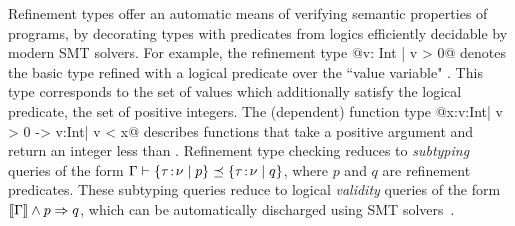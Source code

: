 
Refinement types offer an automatic means 
of verifying semantic properties of programs, 
by decorating types with predicates from logics 
efficiently decidable by modern SMT solvers.
For example, the refinement type 
@{v: Int | v > 0}@
denotes the basic type  refined with a logical
predicate over the ``value variable" .
This type corresponds to the set of  values 
 which additionally satisfy the logical predicate, 
\ie the set of positive integers.  
The (dependent) function type 
@x:{v:Int| v > 0} -> {v:Int| v < x}@
describes functions that take a positive argument 
 and return an integer less than .
%
Refinement type checking reduces to \emph{subtyping} queries 
of the form ${{{\Gamma} \vdash {\{ {{{\tau}}\!:\!{{\nu}}} \mid {p}\}} \preceq {\{ {{{\tau}}\!:\!{{\nu}}} \mid {q}\}}}}$,
where $p$ and $q$ are refinement predicates. 
These subtyping queries reduce to logical \emph{validity} 
queries of the form
${[\![\Gamma]\!] \wedge p \Rightarrow q}$, which can be 
automatically discharged using SMT solvers~\cite{z3}. 
